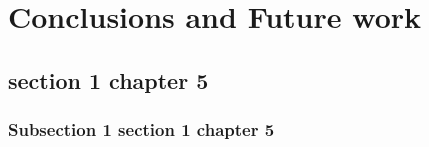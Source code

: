 \chapter{Conclusions and Future work}


\section{section 1 chapter 5}

\subsection{Subsection 1 section 1 chapter 5}